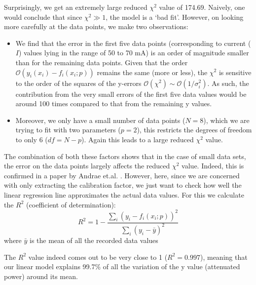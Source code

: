 Surprisingly, we get an extremely large reduced $\chi^{2}$ value of 174.69. Naively, one would conclude that since $\chi^{2}\gg 1$, the model is a `bad fit'. However, on looking more carefully at the data points, we make two observations:
\begin{itemize}
\item We find that the error in the first five data points (corresponding to current ($I$) values lying in the range of 50 to 70 mA) is an order of magnitude smaller than for the remaining data points. Given that the order $\mathcal{O}(y_{i}(x_{i})-f_{i}(x_{i};p))$ remains the same (more or less), the $\chi^{2}$ is sensitive to the order of the squares of the y-errors $\mathcal{O}(\chi^{2})\sim \mathcal{O}\left(1/\sigma_{i}^{2}\right)$. As such, the contribution from the very small errors of the first five data values would be around 100 times compared to that from the remaining y values.
\item Moreover, we only have a small number of data points ($N=8$), which we are trying to fit with two parameters ($p=2$), this restricts the degrees of freedom to only 6 ($df=N-p$). Again this leads to a large reduced $\chi^{2}$ value.
\end{itemize}
The combination of both these factors shows that in the case of small data sets, the error on the data points largely affects the reduced $\chi^{2}$ value. Indeed, this is confirmed in a paper by Andrae et.al. \cite{https://doi.org/10.48550/arxiv.1012.3754}. However, here, since we are concerned with only extracting the calibration factor, we just want to check how well the linear regression line approximates the actual data values. For this we calculate the $R^{2}$ (coefficient of determination): 
\begin{equation}
R^{2}=1-\displaystyle\dfrac{\sum_{i}\left(y_{i}-f_{i}(x_{i};p)\right)^{2}}{\sum_{i}\left(y_{i}-\bar{y}\right)^{2}}
\end{equation}
where $\bar{y}$ is the mean of all the recorded data values

The $R^{2}$ value indeed comes out to be very close to 1 ($R^{2}=0.997$), meaning that our linear model explains 99.7\% of all the variation of the y value (attenuated power) around its mean.

